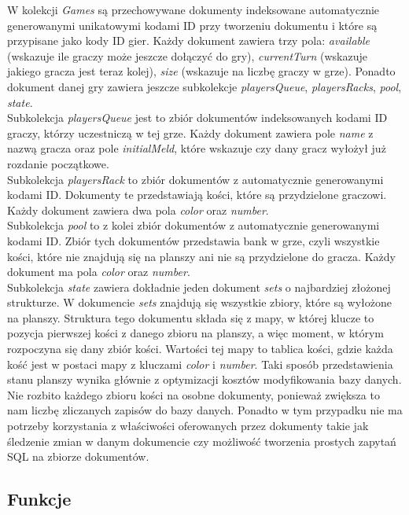 W kolekcji \emph{Games} są przechowywane dokumenty indeksowane automatycznie generowanymi unikatowymi kodami ID przy tworzeniu dokumentu i które są przypisane jako kody ID gier. Każdy dokument zawiera trzy pola: \emph{available} (wskazuje ile graczy może jeszcze dołączyć do gry), \emph{currentTurn} (wskazuje jakiego gracza jest teraz kolej), \emph{size} (wskazuje na liczbę graczy w grze). Ponadto dokument danej gry zawiera jeszcze subkolekcje \emph{playersQueue}, \emph{playersRacks}, \emph{pool}, \emph{state}. \\
Subkolekcja \emph{playersQueue} jest to zbiór dokumentów indeksowanych kodami ID graczy, którzy uczestniczą w tej grze. Każdy dokument zawiera pole \emph{name} z nazwą gracza oraz pole \emph{initialMeld}, które wskazuje czy dany gracz wyłożył już rozdanie początkowe. \\
Subkolekcja \emph{playersRack} to zbiór dokumentów z automatycznie generowanymi kodami ID. Dokumenty te przedstawiają kości, które są przydzielone graczowi. Każdy dokument zawiera dwa pola \emph{color} oraz \emph{number}. \\
Subkolekcja \emph{pool} to z kolei zbiór dokumentów z automatycznie generowanymi kodami ID. Zbiór tych dokumentów przedstawia bank w grze, czyli wszystkie kości, które nie znajdują się na planszy ani nie są przydzielone do gracza. Każdy dokument ma pola \emph{color} oraz \emph{number}. \\
Subkolekcja \emph{state} zawiera dokładnie jeden dokument \emph{sets} o najbardziej złożonej strukturze. W dokumencie \emph{sets} znajdują się wszystkie zbiory, które są wyłożone na planszy. Struktura tego dokumentu składa się z mapy, w której klucze to pozycja pierwszej kości z danego zbioru na planszy, a więc moment, w którym rozpoczyna się dany zbiór kości. Wartości tej mapy to tablica kości, gdzie każda kość jest w postaci mapy z kluczami \emph{color} i \emph{number}. Taki sposób przedstawienia stanu planszy wynika głównie z optymizacji kosztów modyfikowania bazy danych. Nie rozbito każdego zbioru kości na osobne dokumenty, ponieważ zwiększa to nam liczbę zliczanych zapisów do bazy danych. Ponadto w tym przypadku nie ma potrzeby korzystania z właściwości oferowanych przez dokumenty takie jak śledzenie zmian w danym dokumencie czy możliwość tworzenia prostych zapytań SQL na zbiorze dokumentów.


\subsection{Funkcje}

